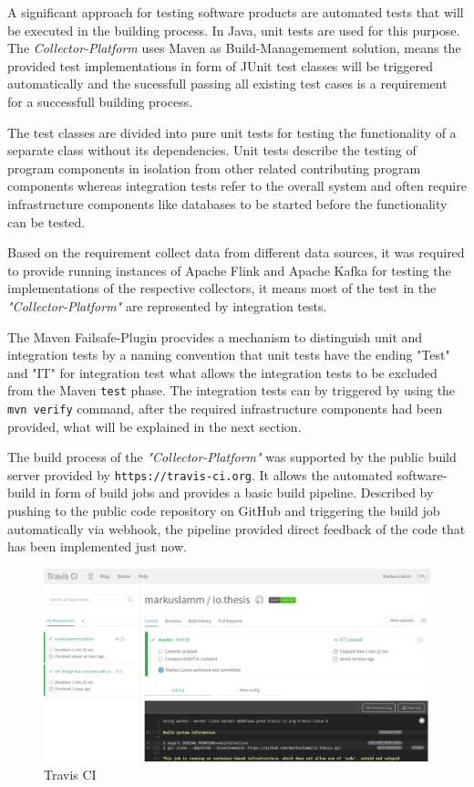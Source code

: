 A significant approach for testing software products are automated tests that will be executed in the building process.
In Java, unit tests are used for this purpose. The \textit{Collector-Platform} uses Maven as Build-Managemement solution,
means the provided test implementations in form of JUnit test classes will be triggered automatically and the sucessfull passing
all existing test cases is a requirement for a successfull building process.

The test classes are divided into pure unit tests for testing the functionality of a separate class without its dependencies.
Unit tests describe the testing of program components in isolation from other related contributing program components whereas
integration tests refer to the overall system and often require infrastructure components like databases to be started before
the functionality can be tested.

Based on the requirement collect data from different data sources, it was required to provide running instances of Apache Flink and Apache Kafka
for testing the implementations of the respective collectors, it means most of the test in the \textit{"Collector-Platform"} are represented by
integration tests.

The Maven Failsafe-Plugin procvides a mechanism to distinguish unit and integration tests by a naming convention that unit tests
have the ending "Test" and "IT" for integration test what allows the integration tests to be excluded from the Maven \verb|test|
phase. The integration tests can by triggered by using the \verb|mvn verify| command, after the required infrastructure components
had been provided, what will be explained in the next section.

The build process of the \textit{"Collector-Platform"} was supported by the public build server provided by \verb|https://travis-ci.org|.
It allows the automated software-build in form of build jobs and provides a basic build pipeline. Described by pushing to the public code
repository on GitHub and triggering the build job automatically via webhook, the pipeline provided direct feedback of the code that has been
implemented just now.
\begin{figure}[H]
	\centering
	\includegraphics[width=1.0\textwidth]{../images/07-travis.png}
	\caption{Travis CI}
	\label{fig:travis}
\end{figure}


